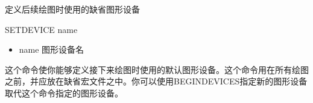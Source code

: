 \label{cmd:setdevice}

定义后续绘图时使用的缺省图形设备

\begin{SACSTX}
SETDEVICE name
\end{SACSTX}

\begin{itemize}
\item name 图形设备名
\end{itemize}

这个命令使你能够定义接下来绘图时使用的默认图形设备。这个命令用在所有绘图之前，并应放在缺省宏文件之中。你可以使用BEGINDEVICES指定新的图形设备取代这个命令指定的图形设备。

